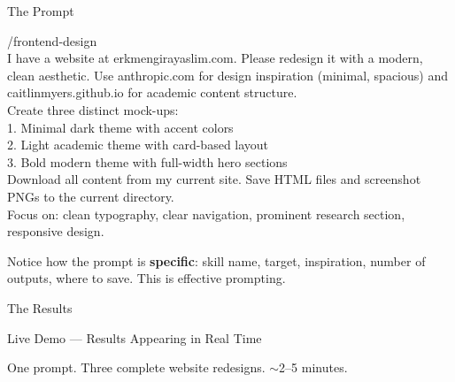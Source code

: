 \documentclass[aspectratio=169, 10pt]{beamer}
\begin{document}
\begin{frame}{The Prompt}
\begin{tcolorbox}[colback=DarkSlate, colframe=DarkSlate, arc=3pt, left=8pt, right=8pt, top=3pt, bottom=3pt]
{\color{CoolGray}\ttfamily\tiny /frontend-design\\[2pt]
\color{white}\tiny
I have a website at erkmengirayaslim.com. Please redesign it with a modern, clean aesthetic. Use anthropic.com for design inspiration (minimal, spacious) and caitlinmyers.github.io for academic content structure.\\[2pt]
Create three distinct mock-ups:\\
1. Minimal dark theme with accent colors\\
2. Light academic theme with card-based layout\\
3. Bold modern theme with full-width hero sections\\[2pt]
Download all content from my current site. Save HTML files and screenshot PNGs to the current directory.\\[2pt]
Focus on: clean typography, clear navigation, prominent research section, responsive design.
}
\end{tcolorbox}
\vskip3pt
\begin{tcolorbox}[quotebox, width=12cm, top=2pt, bottom=2pt]
\small Notice how the prompt is \textbf{specific}: skill name, target, inspiration, number of outputs, where to save. This is effective prompting.
\end{tcolorbox}
\end{frame}

\begin{frame}[fragile]{The Results}
\centering
\vskip4pt
\begin{tcolorbox}[accentbox, width=11cm, halign=center, top=3pt, bottom=3pt]
\normalsize \faLaptopCode\quad Live Demo --- Results Appearing in Real Time
\end{tcolorbox}
\vskip8pt
\vskip8pt
{\small\color{CoolGray} One prompt. Three complete website redesigns. $\sim$2--5 minutes.}
\end{frame}
\end{document}
